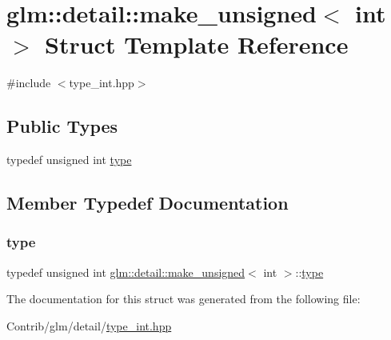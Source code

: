 \hypertarget{structglm_1_1detail_1_1make__unsigned_3_01int_01_4}{}\section{glm\+:\+:detail\+:\+:make\+\_\+unsigned$<$ int $>$ Struct Template Reference}
\label{structglm_1_1detail_1_1make__unsigned_3_01int_01_4}


{\ttfamily \#include $<$type\+\_\+int.\+hpp$>$}

\subsection*{Public Types}
\begin{DoxyCompactItemize}
\item 
typedef unsigned int \mbox{\hyperlink{structglm_1_1detail_1_1make__unsigned_3_01int_01_4_ac3fd57ed35c0305bbe941009a84139c1}{type}}
\end{DoxyCompactItemize}


\subsection{Member Typedef Documentation}
\mbox{\label{structglm_1_1detail_1_1make__unsigned_3_01int_01_4_ac3fd57ed35c0305bbe941009a84139c1}} 
\subsubsection{\texorpdfstring{type}{type}}
{\footnotesize\ttfamily typedef unsigned int \mbox{\hyperlink{structglm_1_1detail_1_1make__unsigned}{glm\+::detail\+::make\+\_\+unsigned}}$<$ int $>$\+::\mbox{\hyperlink{structglm_1_1detail_1_1make__unsigned_3_01int_01_4_ac3fd57ed35c0305bbe941009a84139c1}{type}}}



The documentation for this struct was generated from the following file\+:\begin{DoxyCompactItemize}
\item 
Contrib/glm/detail/\mbox{\hyperlink{type__int_8hpp}{type\+\_\+int.\+hpp}}\end{DoxyCompactItemize}
